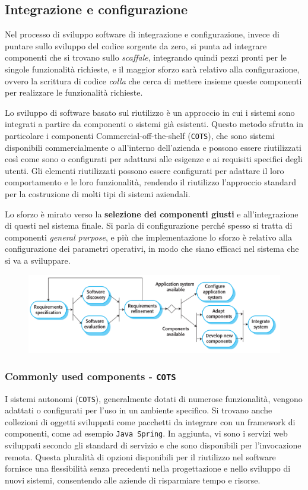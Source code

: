 \subsection{Integrazione e configurazione}
Nel processo di sviluppo software di integrazione e configurazione, 
invece di puntare sullo sviluppo del codice sorgente da zero, si punta ad integrare 
componenti che si trovano sullo \textit{scaffale}, integrando quindi pezzi pronti
per le singole funzionalità richieste, e il maggior sforzo sarà relativo alla 
configurazione, ovvero la scrittura di codice \textit{colla} che cerca di mettere
insieme queste componenti per realizzare le funzionalità richieste.

Lo sviluppo di software basato sul riutilizzo è un approccio in cui i sistemi
sono integrati a partire da componenti o sistemi già esistenti. Questo metodo
sfrutta in particolare i componenti Commercial-off-the-shelf (\texttt{COTS}),
che sono sistemi disponibili commercialmente o all'interno dell'azienda
e possono essere riutilizzati così
come sono o configurati per adattarsi alle esigenze e ai requisiti specifici degli
utenti. Gli elementi riutilizzati possono essere configurati per adattare il loro
comportamento e le loro funzionalità, rendendo il riutilizzo l'approccio standard
per la costruzione di molti tipi di sistemi aziendali.

Lo sforzo è mirato verso la \textbf{selezione dei componenti giusti} e all'integrazione 
di questi nel sistema finale.
Si parla di configurazione perché spesso si tratta di componenti \textit{general purpose},
e più che implementazione lo sforzo è relativo alla configurazione dei parametri operativi,
in modo che siano efficaci nel sistema che si va a sviluppare.

\begin{figure}[H]
    \centering
    \includegraphics[scale=0.35]{img/integr_config.png}
\end{figure}

\subsubsection{Commonly used components - \texttt{COTS}}
I sistemi autonomi (\texttt{COTS}), generalmente dotati di numerose funzionalità, vengono
adattati o configurati per l'uso in un ambiente specifico. Si trovano anche collezioni
di oggetti sviluppati come pacchetti da integrare con un framework di componenti,
come ad esempio \texttt{Java Spring}. In aggiunta, vi sono i servizi web sviluppati secondo
gli standard di servizio e che sono disponibili per l'invocazione remota. Questa
pluralità di opzioni disponibili per il riutilizzo nel software fornisce una
flessibilità senza precedenti nella progettazione e nello sviluppo di nuovi sistemi,
consentendo alle aziende di risparmiare tempo e risorse.
